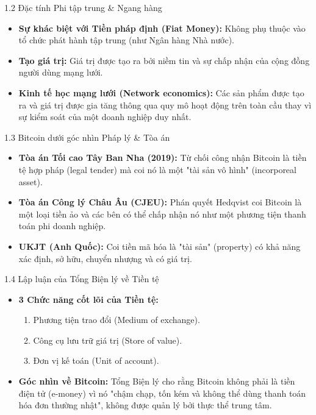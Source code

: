 \documentclass[aspectratio=169]{beamer}
\begin{document}
\begin{frame}{1.2 Đặc tính Phi tập trung \& Ngang hàng}
    \begin{itemize}
        \item \textbf{Sự khác biệt với Tiền pháp định (Fiat Money):} Không phụ thuộc vào tổ chức phát hành tập trung (như Ngân hàng Nhà nước).
        \item \textbf{Tạo giá trị:} Giá trị được tạo ra bởi niềm tin và sự chấp nhận của cộng đồng người dùng mạng lưới.
        \item \textbf{Kinh tế học mạng lưới (Network economics):} Các sản phẩm được tạo ra và giá trị được gia tăng thông qua quy mô hoạt động trên toàn cầu thay vì sự kiểm soát của một doanh nghiệp duy nhất.
    \end{itemize}
\end{frame}

\begin{frame}{1.3 Bitcoin dưới góc nhìn Pháp lý \& Tòa án}
    \begin{itemize}
        \item \textbf{Tòa án Tối cao Tây Ban Nha (2019):} Từ chối công nhận Bitcoin là tiền tệ hợp pháp (legal tender) mà coi nó là một "tài sản vô hình" (incorporeal asset).
        \item \textbf{Tòa án Công lý Châu Âu (CJEU):} Phán quyết Hedqvist coi Bitcoin là một loại tiền ảo và các bên có thể chấp nhận nó như một phương tiện thanh toán phi doanh nghiệp.
        \item \textbf{UKJT (Anh Quốc):} Coi tiền mã hóa là "tài sản" (property) có khả năng xác định, sở hữu, chuyển nhượng và có giá trị.
    \end{itemize}
\end{frame}

\begin{frame}{1.4 Lập luận của Tổng Biện lý về Tiền tệ}
    \begin{itemize}
        \item \textbf{3 Chức năng cốt lõi của Tiền tệ:}
        \begin{enumerate}
            \item Phương tiện trao đổi (Medium of exchange).
            \item Công cụ lưu trữ giá trị (Store of value).
            \item Đơn vị kế toán (Unit of account).
        \end{enumerate}
        \item \textbf{Góc nhìn về Bitcoin:} Tổng Biện lý cho rằng Bitcoin không phải là tiền điện tử (e-money) vì nó "chậm chạp, tốn kém và không thể dùng thanh toán hóa đơn thường nhật", không được quản lý bởi thực thể trung tâm.
    \end{itemize}
\end{frame}
\end{document}

